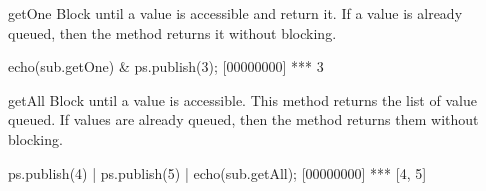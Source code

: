\begin{urbiscriptapi}


\item[getOne]
  Block until a value is accessible and return it.  If a value is already
  queued, then the method returns it without blocking.

\begin{urbiscript}
echo(sub.getOne) &
ps.publish(3);
[00000000] *** 3
\end{urbiscript}


\item[getAll]
  Block until a value is accessible.  This method returns the list of value
  queued.  If values are already queued, then the method returns them
  without blocking.

\begin{urbiscript}
ps.publish(4) |
ps.publish(5) |
echo(sub.getAll);
[00000000] *** [4, 5]
\end{urbiscript}


\end{urbiscriptapi}

